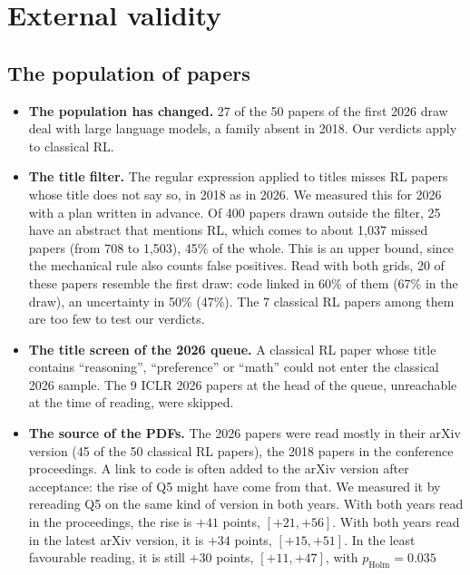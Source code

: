\section{External validity}
\label{sec:val-externe}

\subsection{The population of papers}

\begin{itemize}
  \item \textbf{The population has changed.} 27 of the 50 papers of the first 2026 draw deal with
        large language models, a family absent in 2018. Our verdicts apply to classical RL.
  \item \textbf{The title filter.} The regular expression applied to titles misses RL papers whose
        title does not say so, in 2018 as in 2026. We measured this for 2026 with a plan written in
        advance. Of 400 papers drawn outside the filter, 25 have an abstract that
        mentions RL, which comes to about 1{,}037 missed papers (from 708 to 1{,}503), 45\% of the
        whole. This is an upper bound, since the mechanical rule also counts false positives. Read
        with both grids, 20 of these papers resemble the first draw: code linked in 60\% of them (67\%
        in the draw), an uncertainty in 50\% (47\%). The 7 classical RL papers among them are too few
        to test our verdicts.
  \item \textbf{The title screen of the 2026 queue.} A classical RL paper whose title contains
        \enquote{reasoning}, \enquote{preference} or \enquote{math} could not enter the classical 2026
        sample. The 9 ICLR 2026 papers at the head of the queue, unreachable at the time of reading, were
        skipped.
  \item \textbf{The source of the PDFs.} The 2026 papers were read mostly in their arXiv version (45
        of the 50 classical RL papers), the 2018 papers in the conference proceedings. A link to code
        is often added to the arXiv version after acceptance: the rise of Q5 might have come from
        that. We measured it by rereading Q5 on the same kind of version in both years. With both years read in the proceedings, the rise is $+41$ points, $[+21, +56]$. With
        both years read in the latest arXiv version, it is $+34$ points, $[+15, +51]$. In the least
        favourable reading, it is still $+30$ points, $[+11, +47]$, with $p_{\text{Holm}} = 0.035$

\end{itemize}
